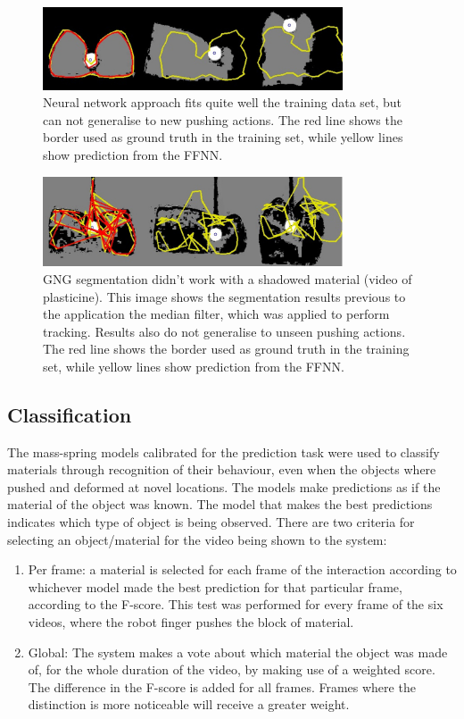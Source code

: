 \documentclass[journal]{IEEEtran}
\begin{document}
\begin{figure}[!t]
\centering
\includegraphics[width=3.5in]{sponge__result}
\caption{Neural network approach fits quite well the training data set, but can not generalise to new pushing actions.  The red line shows the border used as ground truth in the training set, while yellow lines show prediction from the FFNN.}\label{fig:cretu_prediction_sponge}
\end{figure}
\begin{figure}[!t]
\centering
\includegraphics[width=3.5in]{plasticine__result}
\caption{GNG segmentation didn't work with a shadowed material (video of plasticine). This image shows the segmentation results previous to the application the median filter, which was applied to perform tracking.  Results also do not generalise to unseen pushing actions.  The red line shows the border used as ground truth in the training set, while yellow lines show prediction from the FFNN.}\label{fig:cretu_prediction_plasticine}
\end{figure}

\subsection{Classification}

The mass-spring models calibrated for the prediction task were used to classify materials through recognition of their behaviour, even when the objects where pushed and deformed at novel locations.  The models make predictions as if the material of the object was known.  The model that makes the best predictions indicates which type of object is being observed.  There are two criteria for selecting an object/material for the video being shown to the system:

\begin{enumerate}
 \item Per frame: a material is selected for each frame of the interaction according to whichever model made the best prediction for that particular frame, according to the F-score. This test was performed for every frame of the six videos, where the robot finger pushes the block of material.

 \item Global: The system makes a vote about which material the object was made of, for the whole duration of the video, by making use of a weighted score. The difference in the F-score is added for all frames.  Frames where the distinction is more noticeable will receive a greater weight.
\end{enumerate}
\end{document}

